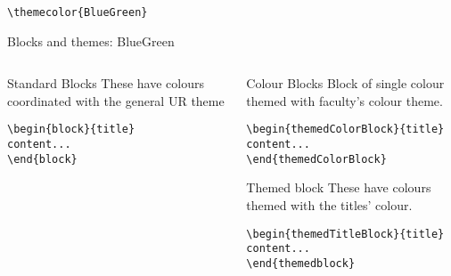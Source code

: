 \begingroup
{}
\begin{center}\verb|\themecolor{BlueGreen}|\end{center}
\begin{frame}[fragile]{Blocks and themes: BlueGreen}
\begin{columns} %
\begin{column}{0.3\textwidth}
\begin{block}{Standard Blocks}
These have colours coordinated with the general UR theme
\begin{verbatim}
\begin{block}{title}
content...
\end{block}
\end{verbatim}
\end{block}
\end{column}
\begin{column}{0.7\textwidth}
\begin{themedColorBlock}{Colour Blocks}
Block of single colour themed with faculty's colour theme.
\small
\begin{verbatim}
\begin{themedColorBlock}{title}
content...
\end{themedColorBlock}
\end{verbatim}
\end{themedColorBlock}
\begin{themedTitleBlock} {Themed block}
These have colours themed with the titles' colour.
\small
\begin{verbatim}
\begin{themedTitleBlock}{title}
content...
\end{themedblock}
\end{verbatim}
\end{themedTitleBlock}
\end{column}
\end{columns}
\end{frame}
\endgroup


